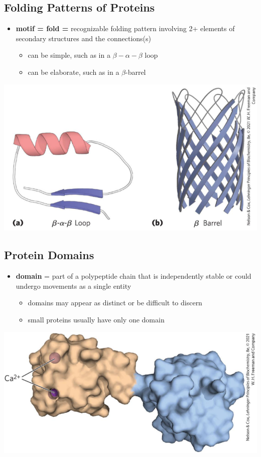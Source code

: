 \documentclass[10pt]{article}
\begin{document}
\subsection*{Folding Patterns of Proteins}
\begin{itemize}
    \item \textbf{motif = fold =} recognizable folding pattern involving 2+ elements of secondary structures and the connections(s)
    \begin{itemize}
        \item can be simple, such as in a $\beta-\alpha-\beta$ loop
        \item can be elaborate, such as in a $\beta$-barrel
    \end{itemize}
\end{itemize}
\begin{center}
    \includegraphics*[scale=0.5]{L1_13.png}
\end{center}

\subsection*{Protein Domains}
\begin{itemize}
    \item \textbf{domain} = part of a polypeptide chain that is independently stable or could undergo movements as a single entity
    \begin{itemize}
        \item domains may appear as distinct or be difficult to discern
        \item small proteins usually have only one domain
    \end{itemize}
\end{itemize}
\begin{center}
    \includegraphics*[scale=0.5]{L1_14.png}
\end{center}
\end{document}
